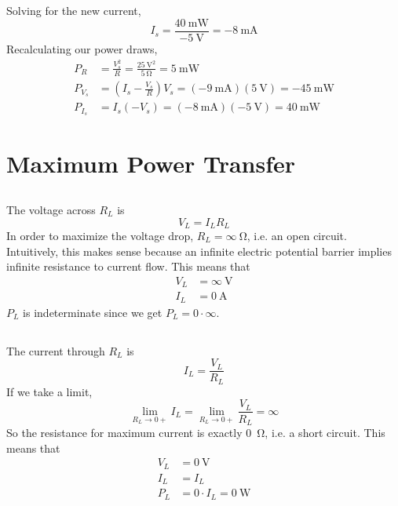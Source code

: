 \documentclass[]{article}
\begin{document}
\subsection{}

Solving for the new current, 
\begin{equation}
	I_s = \frac{40 \ \si{\milli\watt}}{-5 \ \si{\volt}} = \SI{-8}{\milli\ampere}
\end{equation}
Recalculating our power draws, 
\begin{align}
	P_R &= \frac{V_s^2}{R} = \frac{25 \ \si{\square\volt}}{5 \ \si{\ohm}} = \SI{5}{\milli\watt} \\
	P_{V_s} &= \left(I_s - \frac{V_s}{R}\right) V_s = (\SI{-9}{\milli\ampere}) (\SI{5}{\volt}) = \SI{-45}{\milli\watt} \\
	P_{I_s} &= I_s (-V_s) = (\SI{-8}{\milli\ampere}) (\SI{-5}{\volt}) = \SI{40}{\milli\watt}
\end{align}

\section{Maximum Power Transfer}

\subsection{}

The voltage across \(R_L\) is 
\begin{equation}
	V_L = I_L R_L
\end{equation}
In order to maximize the voltage drop, \(R_L = \infty \ \si{\ohm}\), i.e. an open circuit. 
Intuitively, this makes sense because an infinite electric potential barrier implies infinite resistance to current flow. 
This means that 
\begin{align}
	V_L &= \infty \ \si{\volt} \\
	I_L &= \SI{0}{\ampere}
\end{align}
\(P_L\) is indeterminate since we get \(P_L = 0 \cdot \infty\). 

\subsection{}

The current through \(R_L\) is
\begin{equation}
	I_L = \frac{V_L}{R_L}
\end{equation}
If we take a limit, 
\begin{equation}
	\lim_{R_L \to 0+} I_L = \lim_{R_L \to 0+} \frac{V_L}{R_L} = \infty
\end{equation}
So the resistance for maximum current is exactly \SI{0}{\ohm}, i.e. a short circuit. 
This means that 
\begin{align}
	V_L &= \SI{0}{\volt} \\
	I_L &= I_L \\
	P_L &= 0 \cdot I_L = \SI{0}{\watt}
\end{align}
\end{document}
